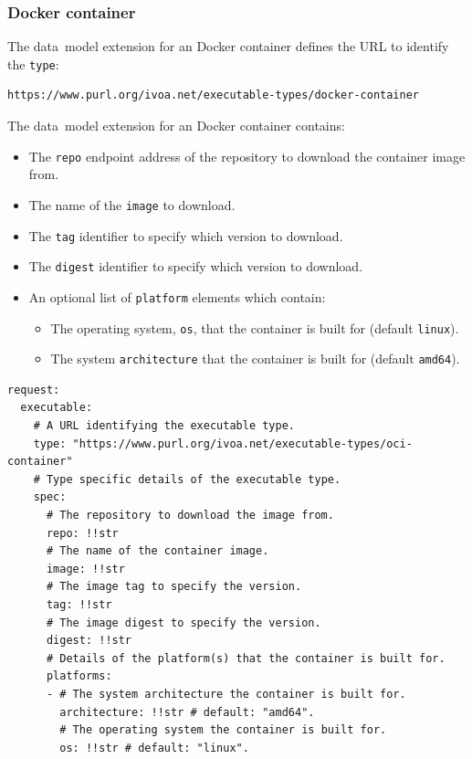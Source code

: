 \documentclass[11pt,a4paper]{ivoa}
\newcommand{\datamodel} {data~model}
\newcommand{\dockercontainer} {Docker container}
\newcommand{\codeword}[1] {\texttt{#1}}
\begin{document}
\subsubsection{Docker container}
\label{subsub-datamodel-docker-container}

The \datamodel{} extension for an \dockercontainer{} defines the URL
to identify the \codeword{type}:
\begin{lstlisting}[]
https://www.purl.org/ivoa.net/executable-types/docker-container
\end{lstlisting}
\hfill \break
The \datamodel{} extension for an \dockercontainer{} contains:
\begin{itemize}
    \item The \codeword{repo} endpoint address of the repository to download the container image from.
    \item The name of the \codeword{image} to download.
    \item The \codeword{tag} identifier to specify which version to download.
    \item The \codeword{digest} identifier to specify which version to download.
    \item An optional list of \codeword{platform} elements which contain:
    \begin{itemize}
        \item The operating system, \codeword{os}, that the container is built for (default \codeword{linux}).
        \item The system \codeword{architecture} that the container is built for (default \codeword{amd64}).
    \end{itemize}


\end{itemize}

\begin{lstlisting}[]
request:
  executable:
    # A URL identifying the executable type.
    type: "https://www.purl.org/ivoa.net/executable-types/oci-container"
    # Type specific details of the executable type.
    spec:
      # The repository to download the image from.
      repo: !!str
      # The name of the container image.
      image: !!str
      # The image tag to specify the version.
      tag: !!str
      # The image digest to specify the version.
      digest: !!str
      # Details of the platform(s) that the container is built for.
      platforms:
      - # The system architecture the container is built for.
        architecture: !!str # default: "amd64".
        # The operating system the container is built for.
        os: !!str # default: "linux".
\end{lstlisting}
\end{document}
